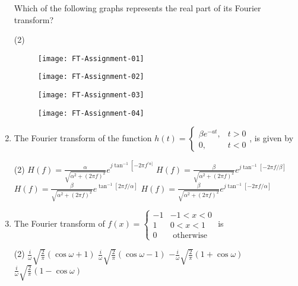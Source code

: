 \begin{enumerate}
	Which of the following graphs represents the real part of its Fourier transform?
	 \begin{tasks}(2)
		\task[\textbf{a.}]	
		\begin{figure}[H]
			\centering
			\texttt{[image: FT-Assignment-01]}
		\end{figure}
		\task[\textbf{b.}]
			\begin{figure}[H]
			\centering
			\texttt{[image: FT-Assignment-02]}
		\end{figure}
		\task[\textbf{c.}]
			\begin{figure}[H]
			\centering
			\texttt{[image: FT-Assignment-03]}
		\end{figure}
		\task[\textbf{d.}] 
			\begin{figure}[H]
			\centering
			\texttt{[image: FT-Assignment-04]}
		\end{figure}
	\end{tasks}
	\item The Fourier transform of the function $h(t)=\left\{\begin{array}{cc}\beta e^{-a t}, & t>0 \\ 0, & t<0\end{array}\right.$, is given by
	 \begin{tasks}(2)
		\task[\textbf{a.}]$H(f)=\frac{\alpha}{\sqrt{\alpha^{2}+(2 \pi f)^{2}}} e^{j \tan ^{-1}\left[-2 \pi f^{\prime \alpha]}\right.}$
		\task[\textbf{b.}]$H(f)=\frac{\beta}{\sqrt{\alpha^{2}+(2 \pi f)^{2}}} e^{j \tan ^{-1}[-2 \pi f / \beta]}$
		\task[\textbf{c.}]$H(f)=\frac{\beta}{\sqrt{\alpha^{2}+(2 \pi f)^{2}}} e^{\tan ^{-1}[2 \pi f / \alpha]}$
		\task[\textbf{d.}] $H(f)=\frac{\beta}{\sqrt{\alpha^{2}+(2 \pi f)^{2}}} e^{j \tan ^{-1}[-2 \pi f / \alpha]}$
	\end{tasks}
	\item The Fourier transform of $f(x)=\left\{\begin{array}{cl}-1 & -1<x<0 \\ 1 & 0<x<1 \\ 0 & \text { otherwise }\end{array}\right.$ is
	 \begin{tasks}(2)
		\task[\textbf{a.}] $\frac{i}{\omega} \sqrt{\frac{2}{\pi}}(\cos \omega+1)$
		\task[\textbf{b.}] $\frac{i}{\omega} \sqrt{\frac{2}{\pi}}(\cos \omega-1)$
		\task[\textbf{c.}]$-\frac{i}{\omega} \sqrt{\frac{2}{\pi}}(1+\cos \omega)$
		\task[\textbf{d.}] $\frac{i}{\omega} \sqrt{\frac{2}{\pi}}(1-\cos \omega)$

\end{tasks}
\end{enumerate}
